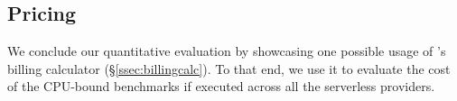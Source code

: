 \subsection{Pricing}
\label{sec:pricing}
We conclude our quantitative evaluation by showcasing one possible usage of \sys's billing calculator (\S\ref{ssec:billingcalc}).
To that end, we use it to evaluate the cost of the CPU-bound benchmarks if executed across all the serverless providers.

%
